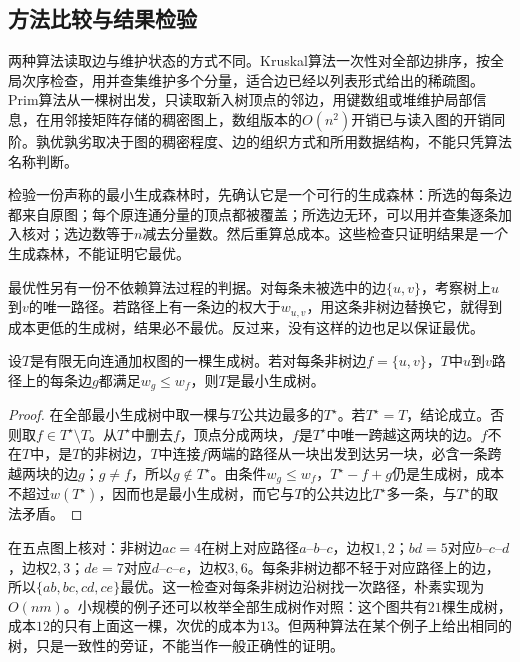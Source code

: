 \subsection{方法比较与结果检验}
\label{sec:graph-opt-mst-comparison}

两种算法读取边与维护状态的方式不同。Kruskal算法一次性对全部边排序，按全局次序检查，用并查集维护多个分量，适合边已经以列表形式给出的稀疏图。Prim算法从一棵树出发，只读取新入树顶点的邻边，用键数组或堆维护局部信息，在用邻接矩阵存储的稠密图上，数组版本的$O(n^2)$开销已与读入图的开销同阶。孰优孰劣取决于图的稠密程度、边的组织方式和所用数据结构，不能只凭算法名称判断。

检验一份声称的最小生成森林时，先确认它是一个可行的生成森林：所选的每条边都来自原图；每个原连通分量的顶点都被覆盖；所选边无环，可以用并查集逐条加入核对；选边数等于$n$减去分量数。然后重算总成本。这些检查只证明结果是\emph{一个}生成森林，不能证明它最优。

最优性另有一份不依赖算法过程的判据。对每条未被选中的边$\{u,v\}$，考察树上$u$到$v$的唯一路径。若路径上有一条边的权大于$w_{u,v}$，用这条非树边替换它，就得到成本更低的生成树，结果必不最优。反过来，没有这样的边也足以保证最优。

\begin{theorem}[非树边条件]
\label{thm:graph-opt-mst-cycle-certificate}
设$T$是有限无向连通加权图的一棵生成树。若对每条非树边$f=\{u,v\}$，$T$中$u$到$v$路径上的每条边$g$都满足$w_g\leq w_f$，则$T$是最小生成树。
\end{theorem}

\begin{proof}
在全部最小生成树中取一棵与$T$公共边最多的$T^\star$。若$T^\star=T$，结论成立。否则取$f\in T^\star\setminus T$。从$T^\star$中删去$f$，顶点分成两块，$f$是$T^\star$中唯一跨越这两块的边。$f$不在$T$中，是$T$的非树边，$T$中连接$f$两端的路径从一块出发到达另一块，必含一条跨越两块的边$g$；$g\neq f$，所以$g\notin T^\star$。由条件$w_g\leq w_f$，$T^\star-f+g$仍是生成树，成本不超过$w(T^\star)$，因而也是最小生成树，而它与$T$的公共边比$T^\star$多一条，与$T^\star$的取法矛盾。
\end{proof}

在五点图上核对：非树边$ac=4$在树上对应路径$a\text{--}b\text{--}c$，边权$1,2$；$bd=5$对应$b\text{--}c\text{--}d$，边权$2,3$；$de=7$对应$d\text{--}c\text{--}e$，边权$3,6$。每条非树边都不轻于对应路径上的边，所以$\{ab,bc,cd,ce\}$最优。这一检查对每条非树边沿树找一次路径，朴素实现为$O(nm)$。小规模的例子还可以枚举全部生成树作对照：这个图共有$21$棵生成树，成本$12$的只有上面这一棵，次优的成本为$13$。但两种算法在某个例子上给出相同的树，只是一致性的旁证，不能当作一般正确性的证明。
